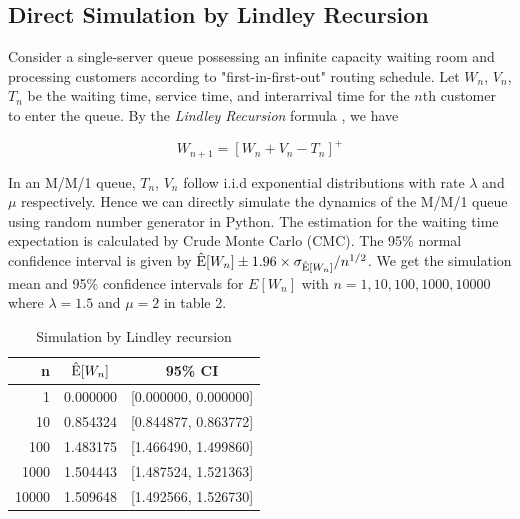 \documentclass{article}
\begin{document}
\subsection{Direct Simulation by Lindley Recursion}
Consider a single-server queue possessing an infinite capacity waiting room and processing customers according to "first-in-first-out" routing schedule. Let $W_n$, $V_n$, $T_n$ be the waiting time, service time, and interarrival time for the $n$th customer to enter the queue. By the \emph{Lindley Recursion} formula \citep{asmussen2007stochastic}, we have

\begin{equation}
	W_{n+1}=[W_n+V_n-T_n]^{+}
\end{equation}

In an M/M/1 queue, $T_n$, $V_n$ follow i.i.d exponential distributions with rate $\lambda$ and $\mu$ respectively. Hence we can directly simulate the dynamics of the M/M/1 queue using random number generator in Python. 
The estimation for the waiting time expectation is calculated by Crude Monte Carlo (CMC). 
The 95\% normal confidence interval is given by ${\rm \hat{E}}[W_n] \pm  1.96\times \sigma_{{\rm \hat{E}}[W_n]} / n^{1/2}$.
We get the simulation mean and 95\% confidence intervals for $E[W_n]$ with $n=1,10,100,1000,10000$ where $\lambda = 1.5$ and $\mu = 2$ in table 2. 


\begin{table}[!htbp]
    \small
	\centering
	\begin{tabularx}{0.4\textwidth}{rcc}
		\toprule
        n
		& $\hat{{\rm E}}[W_n]$ 
        & 95\% CI
		\\

        \midrule
        1
        & 0.000000
        & [0.000000, 0.000000]
		

        \\
        \midrule
        10
        & 0.854324
        & [0.844877, 0.863772]
		

        \\
        \midrule
        100
        & 1.483175
        & [1.466490, 1.499860]
		
        \\
        \midrule
        1000
        & 1.504443 
        & [1.487524, 1.521363]
		
		\\
        \midrule
        10000
        & 1.509648
        & [1.492566, 1.526730]
        \\
		\bottomrule
	\end{tabularx}%
	\label{tab:tab1}%
	\caption{Simulation by Lindley recursion}
\end{table}%
\end{document}
